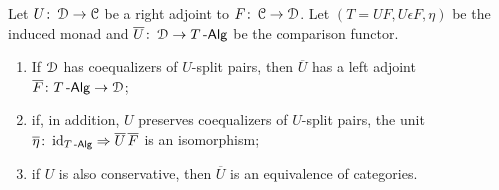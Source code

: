 \documentclass[a4paper,11pt,oneside,openany]{scrbook}
\begin{document}
\begin{teo}[Beck]\label{Beck} Let $U\colon\operatorname{\mathcal{D}}\to\operatorname{\mathcal{C}}$ be a right adjoint to $F\colon\operatorname{\mathcal{C}}\to\operatorname{\mathcal{D}}$. Let $(T=UF, U\epsilon F, \eta)$ be the induced monad and $\overline{U}\colon\operatorname{\mathcal{D}}\to T\operatorname{-\mathsf{Alg}}$ be the comparison functor.
	\begin{enumerate}
		\item If $\operatorname{\mathcal{D}}$ has coequalizers of $U$-split pairs, then $\overline{U}$ has a left adjoint $\overline{F}\colon T\operatorname{-\mathsf{Alg}}\to\operatorname{\mathcal{D}}$;
		\item if, in addition, $U$ preserves coequalizers of $U$-split pairs, the unit $\overline{\eta}\colon\operatorname{id}_{T\operatorname{-\mathsf{Alg}}}\Rightarrow\overline{U}\hspace{.5mm} \overline{F}$ is an isomorphism;
		\item if $U$ is also conservative, then $\overline{U}$ is an equivalence of categories.
	\end{enumerate}
\end{teo}
\end{document}
